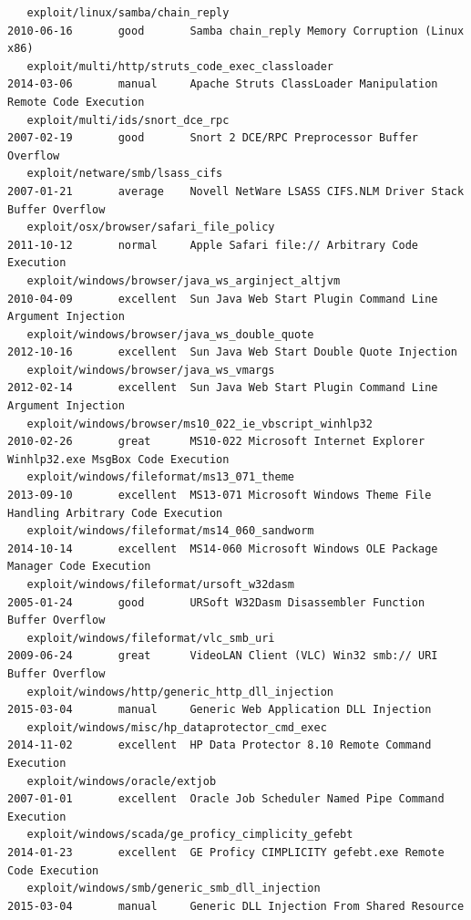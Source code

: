 \documentclass[10pt,a4paper]{report}
\begin{document}
\begin{lstlisting}
   exploit/linux/samba/chain_reply                                 2010-06-16       good       Samba chain_reply Memory Corruption (Linux x86)
   exploit/multi/http/struts_code_exec_classloader                 2014-03-06       manual     Apache Struts ClassLoader Manipulation Remote Code Execution
   exploit/multi/ids/snort_dce_rpc                                 2007-02-19       good       Snort 2 DCE/RPC Preprocessor Buffer Overflow
   exploit/netware/smb/lsass_cifs                                  2007-01-21       average    Novell NetWare LSASS CIFS.NLM Driver Stack Buffer Overflow
   exploit/osx/browser/safari_file_policy                          2011-10-12       normal     Apple Safari file:// Arbitrary Code Execution
   exploit/windows/browser/java_ws_arginject_altjvm                2010-04-09       excellent  Sun Java Web Start Plugin Command Line Argument Injection
   exploit/windows/browser/java_ws_double_quote                    2012-10-16       excellent  Sun Java Web Start Double Quote Injection
   exploit/windows/browser/java_ws_vmargs                          2012-02-14       excellent  Sun Java Web Start Plugin Command Line Argument Injection
   exploit/windows/browser/ms10_022_ie_vbscript_winhlp32           2010-02-26       great      MS10-022 Microsoft Internet Explorer Winhlp32.exe MsgBox Code Execution
   exploit/windows/fileformat/ms13_071_theme                       2013-09-10       excellent  MS13-071 Microsoft Windows Theme File Handling Arbitrary Code Execution
   exploit/windows/fileformat/ms14_060_sandworm                    2014-10-14       excellent  MS14-060 Microsoft Windows OLE Package Manager Code Execution
   exploit/windows/fileformat/ursoft_w32dasm                       2005-01-24       good       URSoft W32Dasm Disassembler Function Buffer Overflow
   exploit/windows/fileformat/vlc_smb_uri                          2009-06-24       great      VideoLAN Client (VLC) Win32 smb:// URI Buffer Overflow
   exploit/windows/http/generic_http_dll_injection                 2015-03-04       manual     Generic Web Application DLL Injection
   exploit/windows/misc/hp_dataprotector_cmd_exec                  2014-11-02       excellent  HP Data Protector 8.10 Remote Command Execution
   exploit/windows/oracle/extjob                                   2007-01-01       excellent  Oracle Job Scheduler Named Pipe Command Execution
   exploit/windows/scada/ge_proficy_cimplicity_gefebt              2014-01-23       excellent  GE Proficy CIMPLICITY gefebt.exe Remote Code Execution
   exploit/windows/smb/generic_smb_dll_injection                   2015-03-04       manual     Generic DLL Injection From Shared Resource

\end{lstlisting}
\end{document}
